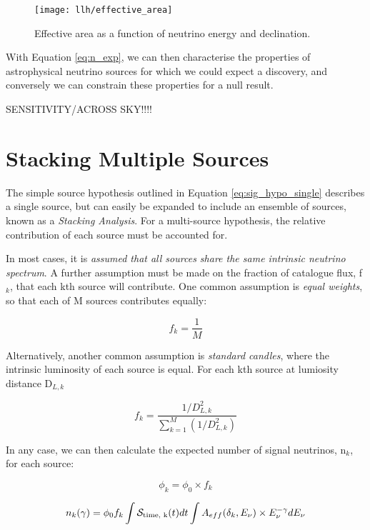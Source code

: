 \begin{figure}[!ht]
	\centering \texttt{[image: llh/effective\_area]}
	\caption{Effective area as a function of neutrino energy and declination.}
	\label{fig:effective_area}
\end{figure}

With Equation \ref{eq:n_exp}, we can then characterise the properties of astrophysical neutrino sources for which we could expect a discovery, and conversely we can constrain these properties for a null result.

SENSITIVITY/ACROSS SKY!!!!

\section{Stacking Multiple Sources}

The simple source hypothesis outlined in Equation \ref{eq:sig_hypo_single} describes a single source, but can easily be expanded to include an ensemble of sources, known as a \emph{Stacking Analysis}. For a multi-source hypothesis, the relative contribution of each source must be accounted for.

In most cases, it is \emph{assumed that all sources share the same intrinsic neutrino spectrum}. A further assumption must be made on the fraction of catalogue flux, f$_{k}$, that each kth source will contribute. One common assumption is \emph{equal weights}, so that each of M sources contributes equally:

\begin{equation}
f_{k} = \frac{1}{M}
\end{equation}

Alternatively, another common assumption is \emph{standard candles}, where the intrinsic luminosity of each source is equal. For each kth source at lumiosity distance D$_{L,k}$

 \begin{equation}
 f_{k} = \frac{1/D_{L,k}^{2}}{\sum^{M}_{k=1}(1/D_{L,k}^{2})}
 \end{equation}

In any case, we can then calculate the expected number of signal neutrinos, n$_{k}$, for each source:

\begin{equation}
\phi_{k} = \phi_{0} \times f_{k}
\end{equation}

\begin{equation}
n_{k} (\gamma) = \phi_{0} f_{k} \int \mathcal{S}_{\textup{time, k}}(t) dt \int A_{eff}(\delta_{k}, E_{\nu}) \times E_{\nu}^{-\gamma} dE_{\nu}
\label{eq:n_k}
\end{equation}

